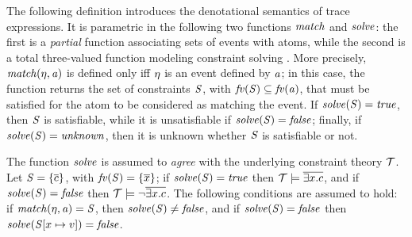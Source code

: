 The following definition introduces the denotational semantics of trace expressions.
It is parametric in the following two functions $\mathit{match}$ and $\mathit{solve}$:
the first is a \emph{partial} function associating sets of events with atoms, while the second is a total three-valued function modeling constraint solving \cite{JAFFAR1998}.
More precisely, $\mathit{match}(\eta,\mathit {a})$ is defined only iff $\eta$ is an event defined by $\mathit {a}$;
in this case, the function returns the set of constraints $\mathit {S}$, with $\mathit{fv}(\mathit {S})\subseteq\mathit{fv}(\mathit {a})$, that must be satisfied for the atom to be considered as matching the event.
If $\mathit{solve}(\mathit {S})=\mathit{true}$, then $\mathit {S}$ is satisfiable, while it is unsatisfiable if $\mathit{solve}(\mathit {S})=\mathit{false}$; finally, if $\mathit{solve}(\mathit {S})=\mathit{unknown}$, then it is unknown whether $\mathit {S}$ is satisfiable or not.

The function $\mathit{solve}$ is assumed to \emph{agree} with the underlying constraint theory $\mathcal{T}$.
Let $\mathit {S}=\{\overline{c}\}$, with $\mathit{fv}(\mathit {S})=\{\overline{x}\}$;
if $\mathit{solve}(\mathit {S})=\mathit{true}$ then $\mathcal{T}\models\overline{\exists x.c}$, and
if $\mathit{solve}(\mathit {S})=\mathit{false}$ then $\mathcal{T}\models\neg\overline{\exists x.c}$.
The following conditions are assumed to hold: if $\mathit{match}(\eta,\mathit {a})=\mathit {S}$, then $\mathit{solve}(\mathit {S})\neq\mathit{false}$, and if $\mathit{solve}(\mathit {S})=\mathit{false}$ then $\mathit{solve}({\mathit {S}}[{x}\mapsto{\ensuremath{v}}])=\mathit{false}$.


